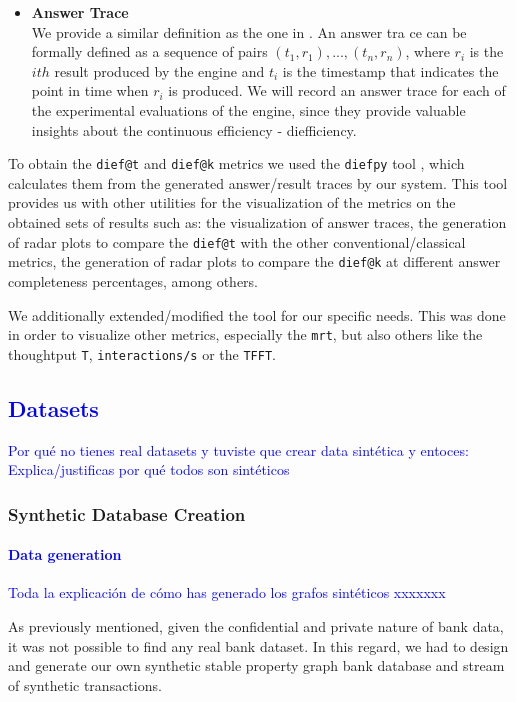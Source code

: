 \begin{itemize}
    \item \textbf{Answer Trace\\}
    We provide a similar definition as the one in \cite{exps-diefficiency}. An answer tra
ce can be formally defined as a sequence of pairs $(t_1,r_1),...,(t_n,r_n)$, where $r_i$ is the $ith$ result produced by the engine and $t_i$ is the timestamp that indicates the point in time when $r_i$ is produced. We will record an answer trace for each of the experimental evaluations of the engine, since they provide valuable insights about the continuous efficiency - diefficiency.

\end{itemize}

To obtain the \texttt{dief@t} and \texttt{dief@k} metrics we used the \texttt{diefpy} tool \cite{exps-diefpy-tool}, which calculates them from the generated answer/result traces by our system. This tool provides us with other utilities for the visualization of the metrics on the obtained sets of results such as: the visualization of answer traces, the generation of radar plots to compare the \texttt{dief@t} with the other conventional/classical metrics, the generation of radar plots to compare the \texttt{dief@k} at different answer completeness percentages, among others.

We additionally extended/modified the tool for our specific needs. This was done in order to visualize other metrics, especially the \texttt{mrt}, but also others like the thoughtput \texttt{T}, \texttt{interactions/s} or the \texttt{TFFT}.


\textcolor{blue}{
\subsection{Datasets}
Por qu\'e no tienes real datasets y tuviste que crear data sint\'etica y entoces:
Explica/justificas por qu\'e todos son sint\'eticos
}

\subsubsection{Synthetic Database Creation}
\textcolor{blue}{
\paragraph{Data generation}
Toda la explicación de c\'omo has generado los grafos sint\'eticos
xxxxxxx
}
As previously mentioned, given the confidential and private nature of bank data, it was not possible to find any real bank dataset. In this regard, we had to design and generate our own synthetic stable property graph bank database and stream of synthetic transactions. 

